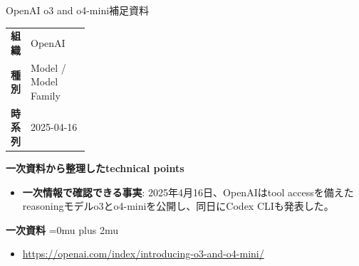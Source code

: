 \begin{technicalnote}{OpenAI o3 and o4-mini}{補足資料}
\begingroup
\begin{tabularx}{\linewidth}{@{}>{\bfseries}p{0.22\linewidth}X@{}}
組織 & OpenAI \\
種別 & Model / Model Family \\
時系列 & 2025-04-16 \\
\end{tabularx}
\smallskip
\begin{minipage}{\linewidth}
{\bfseries 一次資料から整理したtechnical points}
\begin{itemize}[leftmargin=1.5em,itemsep=0.35em]
\item \textbf{一次情報で確認できる事実}: 2025年4月16日、OpenAIはtool accessを備えたreasoningモデルo3とo4-miniを公開し、同日にCodex CLIも発表した。
\end{itemize}
\begin{samepage}
{\bfseries 一次資料}
\begingroup\sloppy
\Urlmuskip=0mu plus 2mu\relax
\begin{itemize}[leftmargin=1.5em,itemsep=0.25em]
\item {\scriptsize\url{https://openai.com/index/introducing-o3-and-o4-mini/}}
\end{itemize}
\endgroup
\end{samepage}
\end{minipage}
\endgroup
\end{technicalnote}
\medskip

